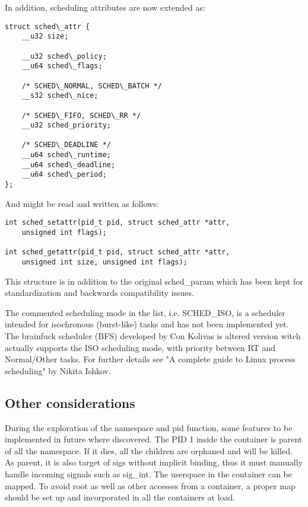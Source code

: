 \documentclass[]{scrartcl}
\begin{document}
In addition, scheduling attributes are now extended as:

\begin{verbatim}
struct sched\_attr {
    __u32 size;
    
    __u32 sched\_policy;
    __u64 sched\_flags;
    
    /* SCHED\_NORMAL, SCHED\_BATCH */
    __s32 sched\_nice;
    
    /* SCHED\_FIFO, SCHED\_RR */
    __u32 sched_priority;
    
    /* SCHED\_DEADLINE */
    __u64 sched\_runtime;
    __u64 sched\_deadline;
    __u64 sched\_period;
};
\end{verbatim}

And might be read and written as follows:


\begin{verbatim}
int sched_setattr(pid_t pid, struct sched_attr *attr,
    unsigned int flags);

int sched_getattr(pid_t pid, struct sched_attr *attr,
    unsigned int size, unsigned int flags);
\end{verbatim}

This structure is in addition to the original sched\_param which has been kept for standardization and backwards compatibility issues.

The commented scheduling mode in the list, i.e. SCHED\_ISO, is a scheduler intended for isochronous (burst-like) tasks and has not been implemented yet. 
The brainfuck scheduler (BFS) developed by Con Kolivas is altered version witch actually supports the ISO scheduling mode, with priority between RT and Normal/Other tasks.
For further details see "A complete guide to Linux process scheduling"  by Nikita Ishkov.

\subsection{Other considerations}

During the exploration of the namespace and pid function, some features to be implemented in future where discovered. 
The PID 1 inside the container is parent of all the namespace. If it dies, all the children are orphaned and will be killed. As parent, it is also target of sigs without implicit binding, thus it must manually handle incoming signals such as sig\_int.
The userspace in the container can be mapped. To avoid root as well as other accesses from a container, a proper map should be set up and incorporated in all the containers at load.
\end{document}
